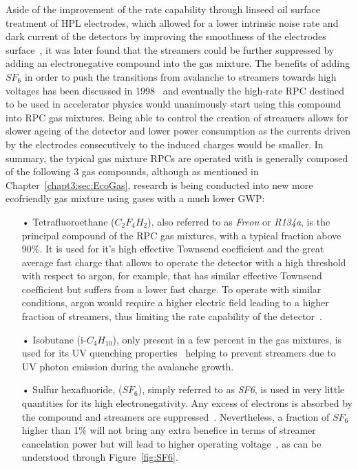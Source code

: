 	Aside of the improvement of the rate capability through linseed oil surface treatment of HPL electrodes, which allowed for a lower intrinsic noise rate and dark current of the detectors by improving the smoothness of the electrodes surface~\cite{ABBRESCIA1997OIL}, it was later found that the streamers could be further suppressed by adding an electronegative compound into the gas mixture. The benefits of adding $SF_6$ in order to push the transitions from avalanche to streamers towards high voltages has been discussed in 1998~\cite{CAMARRI98,ZEBALLOS98} and eventually the high-rate RPC destined to be used in accelerator physics would unanimously start using this compound into RPC gas mixtures. Being able to control the creation of streamers allows for slower ageing of the detector and lower power consumption as the currents driven by the electrodes consecutively to the induced charges would be smaller. In summary, the typical gas mixture RPCs are operated with is generally composed of the following 3 gas compounds, although as mentioned in Chapter~\ref{chapt3:sec:EcoGas}, research is being conducted into new more ecofriendly gas mixture using gases with a much lower \acl{GWP}:
	
	\begin{itemize}
		\item[•] Tetrafluoroethane ($C_2F_4H_2$), also referred to as \textit{Freon} or \textit{R134a}, is the principal compound of the RPC gas mixtures, with a typical fraction above 90\%. It is used for it's high effective Townsend coefficient and the great average fast charge that allows to operate the detector with a high threshold with respect to argon, for example, that has similar effective Townsend coefficient but suffers from a lower fast charge. To operate with similar conditions, argon would require a higher electric field leading to a higher fraction of streamers, thus limiting the rate capability of the detector~\cite{ABBRESCIA1997,ABBRESCIA1997PERF}.
		\item[•] Isobutane (i-$C_4H_{10}$), only present in a few percent in the gas mixtures, is used for its UV quenching properties~\cite{BATTISTONI85} helping to prevent streamers due to UV photon emission during the avalanche growth.
		\item[•] Sulfur hexafluoride, ($SF_6$), simply referred to as \textit{SF6}, is used in very little quantities for its high electronegativity. Any excess of electrons is absorbed by the compound and streamers are suppressed~\cite{CAMARRI98,ZEBALLOS98}. Nevertheless, a fraction of $SF_6$ higher than 1\% will not bring any extra benefice in terms of streamer cancelation power but will lead to higher operating voltage~\cite{CAMARRI98}, as can be understood through Figure~\ref{fig:SF6}.
	\end{itemize}
	
